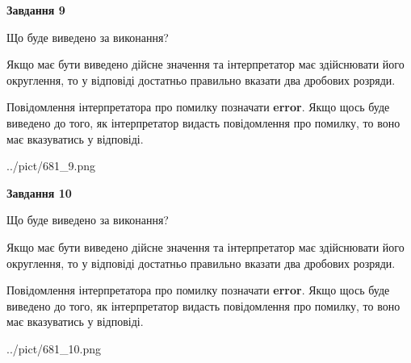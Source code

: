 \documentclass[12pt, ukrainian]{article}
\begin{document}
{\begin {Large}
{\begin {center}\textbf{Завдання 9}\end {center}}\par
Що буде виведено за виконання? \par

Якщо має бути виведено дійсне значення та інтерпретатор має здійснювати його округлення, 
то у відповіді достатньо правильно вказати два дробових розряди.

Повідомлення інтерпретатора про помилку позначати \textbf{error}.
Якщо щось буде виведено до того, як інтерпретатор видасть повідомлення про помилку, 
то воно має вказуватись у відповіді. \par

\begin{center}
	{../pict/681_9.png}
\end{center}
\newpage

{\begin {center}\textbf{Завдання 10}\end {center}}\par
Що буде виведено за виконання? \par

Якщо має бути виведено дійсне значення та інтерпретатор має здійснювати його округлення, 
то у відповіді достатньо правильно вказати два дробових розряди.

Повідомлення інтерпретатора про помилку позначати \textbf{error}.
Якщо щось буде виведено до того, як інтерпретатор видасть повідомлення про помилку, 
то воно має вказуватись у відповіді. \par

\begin{center}
	{../pict/681_10.png}
\end{center}
\newpage

\end {Large}}
\end{document}

